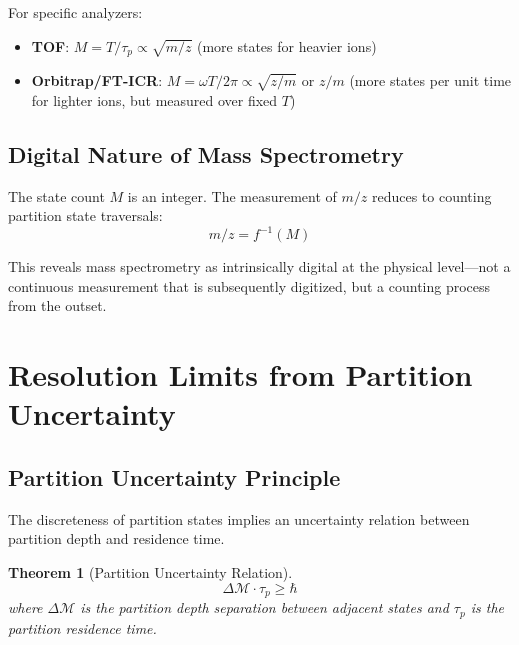\documentclass[twocolumn,10pt,a4paper]{article}
\newtheorem{theorem}{Theorem}[section]
\theoremstyle{definition}
\theoremstyle{remark}
\newcommand{\Mdepth}{\mathcal{M}}
\newcommand{\taup}{\tau_p}
\begin{document}
For specific analyzers:
\begin{itemize}
    \item \textbf{TOF}: $M = T/\taup \propto \sqrt{m/z}$ (more states for heavier ions)
    \item \textbf{Orbitrap/FT-ICR}: $M = \omega T/2\pi \propto \sqrt{z/m}$ or $z/m$ (more states per unit time for lighter ions, but measured over fixed $T$)
\end{itemize}

\subsection{Digital Nature of Mass Spectrometry}

The state count $M$ is an integer. The measurement of $m/z$ reduces to counting partition state traversals:
\begin{equation}
    m/z = f^{-1}(M)
    \label{eq:mz_from_count}
\end{equation}

This reveals mass spectrometry as intrinsically digital at the physical level---not a continuous measurement that is subsequently digitized, but a counting process from the outset.

\section{Resolution Limits from Partition Uncertainty}
\label{sec:resolution}

\subsection{Partition Uncertainty Principle}

The discreteness of partition states implies an uncertainty relation between partition depth and residence time.

\begin{theorem}[Partition Uncertainty Relation]
\label{thm:uncertainty}
\begin{equation}
    \boxed{\Delta\Mdepth \cdot \taup \geq \hbar}
    \label{eq:partition_uncertainty}
\end{equation}
where $\Delta\Mdepth$ is the partition depth separation between adjacent states and $\taup$ is the partition residence time.
\end{theorem}
\end{document}
